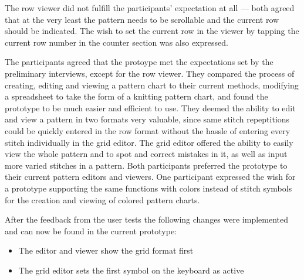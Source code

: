 The row viewer did not fulfill the participants' expectation at all --- both agreed that at the very least the pattern needs to be scrollable and the current row should be indicated. The wish to set the current row in the viewer by tapping the current row number in the counter section was also expressed.

The participants agreed that the protoype met the expectations set by the preliminary interviews, except for the row viewer. They compared the process of creating, editing and viewing a pattern chart to their current methods, modifying a spreadsheet to take the form of a knitting pattern chart, and found the prototype to be much easier and efficient to use. They deemed the ability to edit and view a pattern in two formats very valuable, since same stitch repeptitions could be quickly entered in the row format without the hassle of entering every stitch individually in the grid editor. The grid editor offered the ability to easily view the whole pattern and to spot and correct mistakes in it, as well as input more varied stitches in a pattern. Both participants preferred the prototype to their current pattern editors and viewers. One participant expressed the wish for a prototype supporting the same functions with colors instead of stitch symbols for the creation and viewing of colored pattern charts.

After the feedback from the user tests the following changes were implemented and can now be found in the current prototype:

\begin{itemize}
	\item The editor and viewer show the grid format first
	\item The grid editor sets the first symbol on the keyboard as active
\end{itemize} 